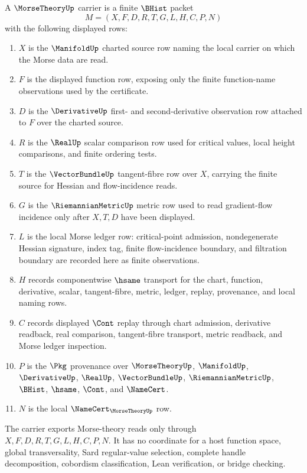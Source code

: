 \begin{definition}
\label{def:morse-theory-carrier}
A $\MorseTheoryUp$ carrier is a finite $\BHist$ packet
$$
M=(X,F,D,R,T,G,L,H,C,P,N)
$$
with the following displayed rows:
\begin{enumerate}
\item $X$ is the $\ManifoldUp$ charted source row naming the local carrier on which the Morse data are read.
\item $F$ is the displayed function row, exposing only the finite function-name observations used by the certificate.
\item $D$ is the $\DerivativeUp$ first- and second-derivative observation row attached to $F$ over the charted source.
\item $R$ is the $\RealUp$ scalar comparison row used for critical values, local height comparisons, and finite ordering tests.
\item $T$ is the $\VectorBundleUp$ tangent-fibre row over $X$, carrying the finite source for Hessian and flow-incidence reads.
\item $G$ is the $\RiemannianMetricUp$ metric row used to read gradient-flow incidence only after $X,T,D$ have been displayed.
\item $L$ is the local Morse ledger row: critical-point admission, nondegenerate Hessian signature, index tag, finite flow-incidence boundary, and filtration boundary are recorded here as finite observations.
\item $H$ records componentwise $\hsame$ transport for the chart, function, derivative, scalar, tangent-fibre, metric, ledger, replay, provenance, and local naming rows.
\item $C$ records displayed $\Cont$ replay through chart admission, derivative readback, real comparison, tangent-fibre transport, metric readback, and Morse ledger inspection.
\item $P$ is the $\Pkg$ provenance over $\MorseTheoryUp$, $\ManifoldUp$, $\DerivativeUp$, $\RealUp$, $\VectorBundleUp$, $\RiemannianMetricUp$, $\BHist$, $\hsame$, $\Cont$, and $\NameCert$.
\item $N$ is the local $\NameCert_{\MorseTheoryUp}$ row.
\end{enumerate}
The carrier exports Morse-theory reads only through $X,F,D,R,T,G,L,H,C,P,N$. It has no coordinate for a host function space, global transversality, Sard regular-value selection, complete handle decomposition, cobordism classification, Lean verification, or bridge checking.
\end{definition}

